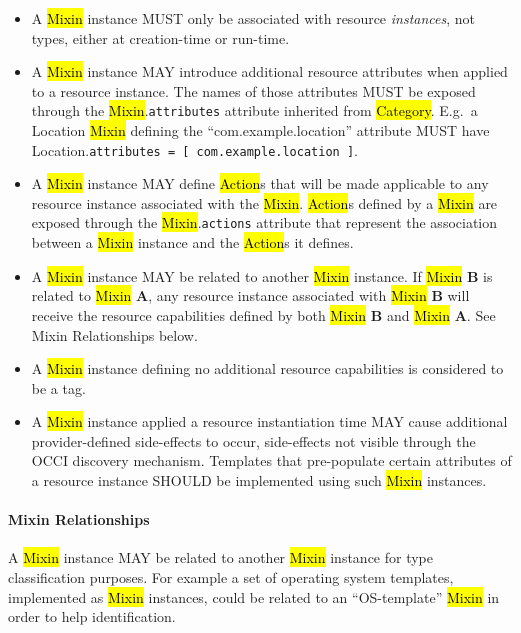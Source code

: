 \documentclass[10pt,a4paper]{article}
\begin{document}
\begin{itemize}
  \item A \hl{Mixin} instance MUST only be associated with resource
    {\em instances}, not types, either at creation-time or run-time.
  \item A \hl{Mixin} instance MAY introduce additional resource
    attributes when applied to a resource instance. The names of those
    attributes MUST be exposed through the \hl{Mixin}.{\tt attributes}
    attribute inherited from \hl{Category}.  E.g.~a Location
    \hl{Mixin} defining the ``com.example.location'' attribute MUST
    have Location.{\tt attributes = [ com.example.location ]}.
  \item A \hl{Mixin} instance MAY define \hl{Action}s that will be
    made applicable to any resource instance associated with the
    \hl{Mixin}.  \hl{Action}s defined by a \hl{Mixin} are exposed
    through the \hl{Mixin}.{\tt actions} attribute that represent the
    association between a \hl{Mixin} instance and the \hl{Action}s it
    defines.
  \item A \hl{Mixin} instance MAY be related to another \hl{Mixin}
    instance.  If \hl{Mixin} {\bf B} is related to \hl{Mixin} {\bf A},
    any resource instance associated with \hl{Mixin} {\bf B} will
    receive the resource capabilities defined by both \hl{Mixin} {\bf
      B} and \hl{Mixin} {\bf A}.  See Mixin Relationships below.
  \item A \hl{Mixin} instance defining no additional resource
    capabilities is considered to be a tag.
  \item A \hl{Mixin} instance applied a resource instantiation time
    MAY cause additional provider-defined side-effects to occur,
    side-effects not visible through the OCCI discovery
    mechanism. Templates that pre-populate certain attributes of a
    resource instance SHOULD be implemented using such \hl{Mixin}
    instances.
\end{itemize}

\paragraph*{Mixin Relationships}

A \hl{Mixin} instance MAY be related to another \hl{Mixin} instance
for type classification purposes. For example a set of operating
system templates, implemented as \hl{Mixin} instances, could be
related to an ``OS-template'' \hl{Mixin} in order to help
identification.
\end{document}
